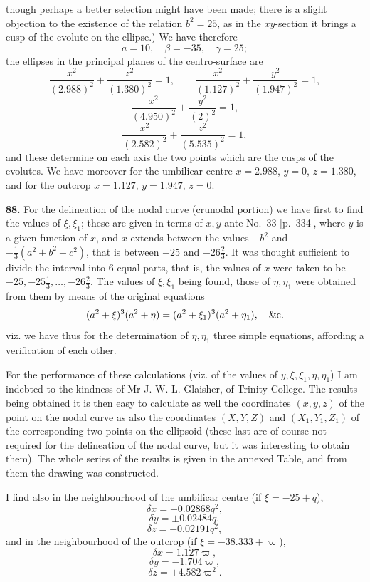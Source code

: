 \documentclass[11pt,a4paper]{article}
\begin{document}
though perhaps a better selection might have been made; there is a slight objection
to the existence of the relation $b^2=25$, as in the $xy$-section it brings a cusp of
the evolute on the ellipse.) We have therefore
\[
a = 10,\quad \beta = -35,\quad \gamma=25;
\]
the ellipses in the principal planes of the centro-surface are
\[
\frac{x^2}{(2.988)^2}+\frac{z^2}{(1.380)^2}=1,\qquad
\frac{x^2}{(1.127)^2}+\frac{y^2}{(1.947)^2}=1,
\]
\[
\frac{x^2}{(4.950)^2}+\frac{y^2}{(2)^2}=1,
\]
\[
\frac{x^2}{(2.582)^2}+\frac{z^2}{(5.535)^2}=1,
\]
and these determine on each axis the two points which are the cusps of the evolutes.
We have moreover for the umbilicar centre $x=2.988$, $y=0$, $z=1.380$, and for
the outcrop $x=1.127$, $y=1.947$, $z=0$.

\textbf{88.} For the delineation of the nodal curve (crunodal portion) we have first
to find the values of $\xi,\xi_1$; these are given in terms of $x,y$ ante No.~33
[p.~334], where $y$ is a given function of $x$, and $x$ extends between the values
$-b^2$ and $-\frac{1}{3}(a^2+b^2+c^2)$, that is between $-25$ and $-26\frac{2}{3}$.
It was thought sufficient to divide the interval into 6 equal parts, that is, the
values of $x$ were taken to be $-25,-25\frac{1}{3},\ldots,-26\frac{2}{3}$. The
values of $\xi,\xi_1$ being found, those of $\eta,\eta_1$ were obtained from them
by means of the original equations
\[
(a^2+\xi)^3(a^2+\eta)=(a^2+\xi_1)^3(a^2+\eta_1),\quad\hbox{\&c.}
\]
viz. we have thus for the determination of $\eta,\eta_1$ three simple equations,
affording a verification of each other.

For the performance of these calculations (viz. of the values of $y,\xi,\xi_1,\eta,\eta_1$)
I am indebted to the kindness of Mr J. W. L. Glaisher, of Trinity College. The results
being obtained it is then easy to calculate as well the coordinates $(x,y,z)$ of the
point on the nodal curve as also the coordinates $(X,Y,Z)$ and $(X_1,Y_1,Z_1)$ of
the corresponding two points on the ellipsoid (these last are of course not required for
the delineation of the nodal curve, but it was interesting to obtain them). The
whole series of the results is given in the annexed Table, and from them the drawing
was constructed.

I find also in the neighbourhood of the umbilicar centre (if $\xi=-25+q$),
\[
\delta x = -0.02868q^2,
\]
\[
\delta y = \pm 0.02484q,
\]
\[
\delta z = -0.02191q^2,
\]
and in the neighbourhood of the outcrop (if $\xi=-38.333+\varpi$),
\[
\delta x = 1.127\varpi,
\]
\[
\delta y = -1.704\varpi,
\]
\[
\delta z = \pm 4.582\varpi^2.
\]
\end{document}
